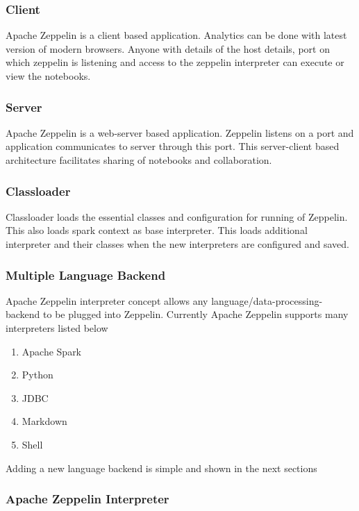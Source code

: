 \documentclass[9pt,twocolumn,twoside]{../../styles/osajnl}
\begin{document}
	\subsubsection{Client}
	Apache Zeppelin is a client based application. Analytics can be 
	done with latest version of modern browsers. Anyone with details 
	of the host details, port on which zeppelin is listening and 
	access to the zeppelin interpreter can execute or view the 
	notebooks.
	
	\subsubsection{Server}
	Apache Zeppelin is a web-server based application. Zeppelin 
	listens on a port and application communicates to server through 
	this port. This server-client based architecture facilitates 
	sharing of notebooks and collaboration.  
	
	\subsubsection{Classloader}
	Classloader loads the essential classes and configuration for 
	running of Zeppelin. This also loads spark context as base 
	interpreter. This loads additional interpreter and their classes 
	when the new interpreters are configured and saved.
	
	\subsubsection{Multiple Language Backend}
	
	Apache Zeppelin interpreter concept allows any 
	language/data-processing-backend to be plugged into Zeppelin. 
	Currently Apache Zeppelin supports many interpreters listed below
	
	\begin{enumerate}
		\item Apache Spark
		\item Python
		\item JDBC
		\item Markdown
		\item Shell
	\end{enumerate}
	
	Adding a new language backend is simple and shown in the next 
	sections
	
	\subsubsection{Apache Zeppelin Interpreter}
	
\end{document}
